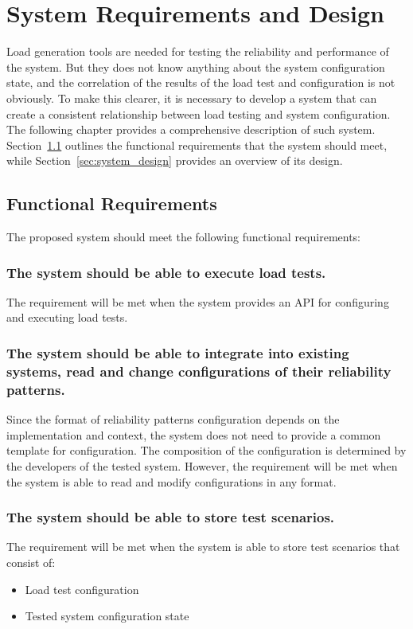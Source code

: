 \graphicspath{{figs/}} %


\chapter{System Requirements and Design}
\label{ch:design}

Load generation tools are needed for testing the reliability and performance of the system. But they does not know anything about the system configuration state, and the correlation of the results of the load test and configuration is not obviously. To make this clearer, it is necessary to develop a system that can create a consistent relationship between load testing and system configuration. The following chapter provides a comprehensive description of such system. Section~\ref{sec:functional-requirements} outlines the functional requirements that the system should meet, while Section~\ref{sec:system_design} provides an overview of its design.


\section{Functional Requirements}\label{sec:functional-requirements}
The proposed system should meet the following functional requirements:

\subsection{The system should be able to execute load tests.}\label{subsec:fr:execute_load_test}
The requirement will be met when the system provides an API for configuring and executing load tests.

\subsection{The system should be able to integrate into existing systems, read and change configurations of their reliability patterns.}\label{subsec:fr:integrate}
Since the format of reliability patterns configuration depends on the implementation and context, the system does not need to provide a common template for configuration. The composition of the configuration is determined by the developers of the tested system. However, the requirement will be met when the system is able to read and modify configurations in any format.

\subsection{The system should be able to store test scenarios.}\label{subsec:fr:store_scenarios}
The requirement will be met when the system is able to store test scenarios that consist of:
\begin{itemize}
    \item Load test configuration
    \item Tested system configuration state
\end{itemize}

